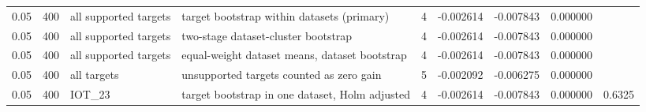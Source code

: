 \begin{tabular}{lllllllll}
0.05 & 400 & all supported targets & target bootstrap within datasets (primary) & 4 & -0.002614 & -0.007843 & 0.000000 &  \\
0.05 & 400 & all supported targets & two-stage dataset-cluster bootstrap & 4 & -0.002614 & -0.007843 & 0.000000 &  \\
0.05 & 400 & all supported targets & equal-weight dataset means, dataset bootstrap & 4 & -0.002614 & -0.007843 & 0.000000 &  \\
0.05 & 400 & all targets & unsupported targets counted as zero gain & 5 & -0.002092 & -0.006275 & 0.000000 &  \\
0.05 & 400 & IOT\_23 & target bootstrap in one dataset, Holm adjusted & 4 & -0.002614 & -0.007843 & 0.000000 & 0.6325 \\
\bottomrule
\end{tabular}
